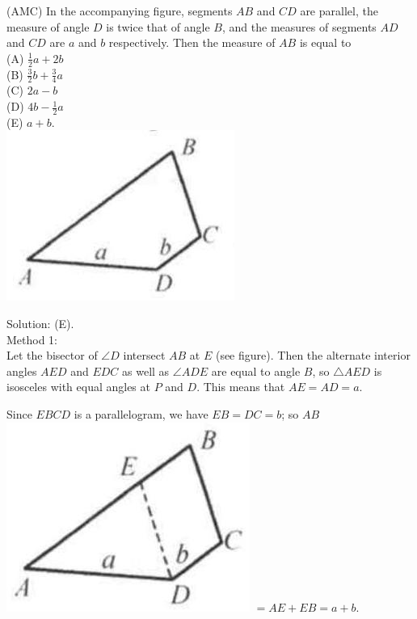 \documentclass{article}
\begin{document}
(AMC) In the accompanying figure, segments \(A B\) and \(C D\) are parallel, the measure of angle \(D\) is twice that of angle \(B\), and the measures of segments \(A D\) and \(C D\) are \(a\) and \(b\) respectively. Then the measure of \(A B\) is equal to\\
(A) \(\frac{1}{2} a+2 b\)\\
(B) \(\frac{3}{2} b+\frac{3}{4} a\)\\
(C) \(2 a-b\)\\
(D) \(4 b-\frac{1}{2} a\)\\
(E) \(a+b\).\\
\centering
\includegraphics[width=\textwidth]{images/110(3).jpg}

Solution: (E).\\
Method 1:\\
Let the bisector of \(\angle D\) intersect \(A B\) at \(E\) (see figure). Then the alternate interior angles \(A E D\) and \(E D C\) as well as \(\angle A D E\) are equal to angle \(B\), so \(\triangle A E D\) is isosceles with equal angles at \(P\) and \(D\). This means that \(A E=A D=a\).

Since \(E B C D\) is a parallelogram, we have \(E B=D C=b\); so \(A B\)\\
\includegraphics[width=\textwidth]{images/110(2).jpg} \(=A E+E B=a+b\).
\end{document}

